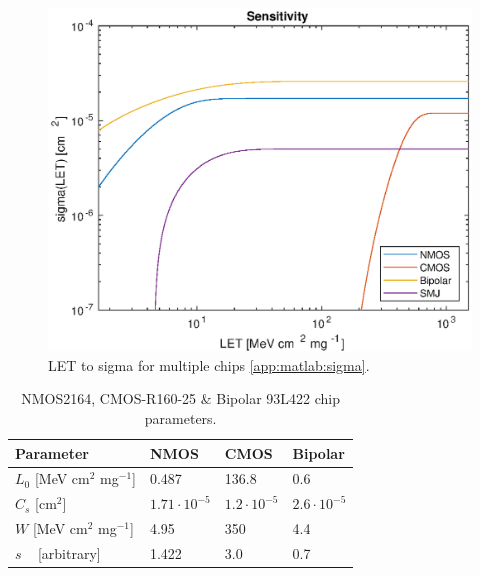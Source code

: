 \begin{figure}[H]
\centering
\includegraphics[width=.7\textwidth]{data/sigma/sensitivity.eps}
\caption{LET to sigma for multiple chips \ref{app:matlab:sigma}.}
\label{fig:matlab:LET-sigma-all}
\end{figure}

\begin{table}[H]
\centering
\begin{tabular}{|l|l|l|l|}
\hline
\textbf{Parameter} & \textbf{NMOS} & \textbf{CMOS} & \textbf{Bipolar} \\\hline

$L_0$ [MeV cm$^2$ mg$^{-1}$] & 0.487 & 136.8 & 0.6 \\\hline
$C_s$ [cm$^2$] & $1.71 \cdot 10^{-5}$ & $1.2 \cdot 10^{-5}$ & $2.6 \cdot 10^{-5}$ \\\hline
$W$   [MeV cm$^2$ mg$^{-1}$] & 4.95 & 350 & 4.4 \\\hline
$s$  ~ [arbitrary] & 1.422 & 3.0 & 0.7 \\\hline

\end{tabular}
\caption{NMOS2164, CMOS-R160-25 \& Bipolar 93L422 chip parameters.}
\label{tab:all-LET}
\end{table}



